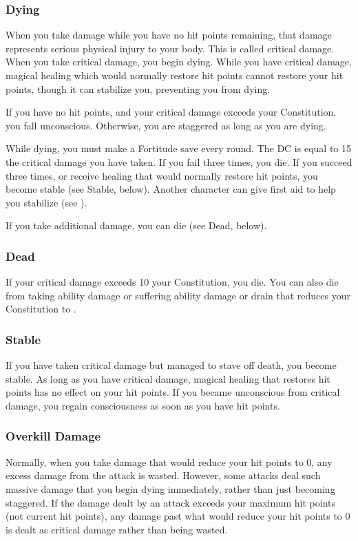 \subsubsection{Dying}\label{Dying}
When you take damage while you have no hit points remaining, that damage represents serious physical injury to your body. This is called critical damage. When you take critical damage, you begin dying. While you have critical damage, magical healing which would normally restore hit points cannot restore your hit points, though it can stabilize you, preventing you from dying.

If you have no hit points, and your critical damage exceeds your Constitution, you fall unconscious. Otherwise, you are staggered as long as you are dying.

While dying, you must make a Fortitude save every round. The DC is equal to 15 \add the critical damage you have taken. If you fail three times, you die. If you succeed three times, or receive healing that would normally restore hit points, you become stable (see Stable, below). Another character can give first aid to help you stabilize (see ).

If you take additional damage, you can die (see Dead, below).

\subsubsection{Dead}
If your critical damage exceeds 10 \add your Constitution, you die. You can also die from taking ability damage or suffering ability damage or drain that reduces your Constitution to .

\subsubsection{Stable}\label{Stable}
If you have taken critical damage but managed to stave off death, you become stable. As long as you have critical damage, magical healing that restores hit points has no effect on your hit points. If you became unconscious from critical damage, you regain consciousness as soon as you have hit points.

\subsubsection{Overkill Damage}
Normally, when you take damage that would reduce your hit points to 0, any excess damage from the attack is wasted. However, some attacks deal such massive damage that you begin dying immediately, rather than just becoming staggered. If the damage dealt by an attack exceeds your maximum hit points (not current hit points), any damage past what would reduce your hit points to 0 is dealt as critical damage rather than being wasted.

